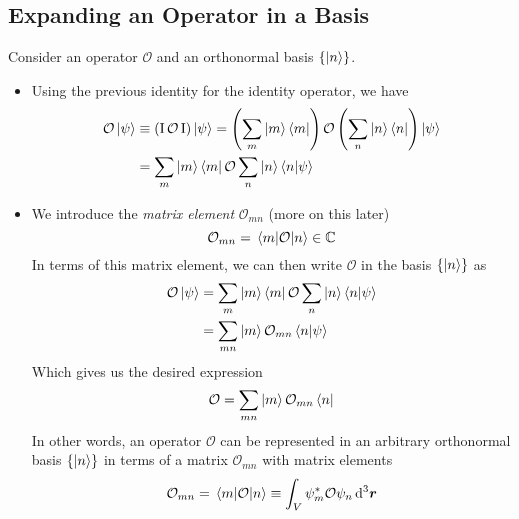 \documentclass[11pt, a4paper]{article}
\newcommand{\diff}{\mathop{}\!\mathrm{d}} %
\newcommand{\dr}{\diff^{3} \r}  %
\renewcommand{\vec}[1]{\bm{#1}}  %
\renewcommand{\r}{\vec{r}}  %
\renewcommand{\O}{\mathcal{O}}  %
\newcommand{\II}{\operatorname{I}}  %
\newcommand{\p}{\psi}  %
\begin{document}
\subsection{Expanding an Operator in a Basis}
Consider an operator $ \O $ and an orthonormal basis $ \{\ket{n}\} $. 
\begin{itemize}
	\item Using the previous identity for the identity operator, we have
	\begin{align*}
		\O \ket{\p} &\equiv (\II \O \II) \ket{\p} = \left(\sum_{m} \ket{m} \bra{m}\right) \O \left(\sum_{n} \ket{n} \bra{n}\right) \ket{\p}\\
		& = \sum_{m}\ket{m}\bra{m} \O \sum_{n} \ket{n} \braket{n}{\p}
	\end{align*}
	
	\item We introduce the \textit{matrix element} $ \O_{mn} $ (more on this later)
	\begin{equation*}
		\O_{mn} = \mel{m}{\O}{n} \in \mathbb{C}
	\end{equation*}
	In terms of this matrix element, we can then write $ \O $ in the basis $ \{\ket{n}\} $ as
	\begin{align*}
		\O \ket{\p} & = \sum_{m}\ket{m}\bra{m} \O \sum_{n} \ket{n} \braket{n}{\p}\\
		& = \sum_{mn} \ket{m}\O_{mn}\bra{n} \ket{\p}
	\end{align*}
	Which gives us the desired expression
	\begin{equation*}
		\O = \sum_{mn} \ket{m}\O_{mn}\bra{n}
	\end{equation*}
	In other words, an operator $ \O $ can be represented in an arbitrary orthonormal basis $ \{\ket{n}\} $ in terms of a matrix $ \O_{mn} $ with matrix elements
	\begin{equation*}
		\O_{mn} = \mel{m}{\O}{n} \equiv \int_{V} \psi_{m}^{*}\O \psi_{n} \dr 
	\end{equation*}
	

\end{itemize}
\end{document}
